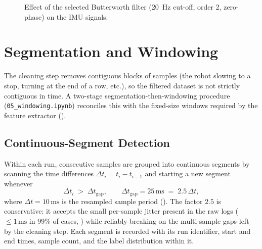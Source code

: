 \begin{figure}[H]
    \centering
    \caption{Effect of the selected Butterworth filter
    (\SI{20}{\hertz} cut-off, order 2, zero-phase) on the IMU signals.}
    \label{fig:filter_effect}
\end{figure}

\section{Segmentation and Windowing}
\label{sec:windowing}

The cleaning step removes contiguous blocks of samples (the robot slowing to a stop, turning at the end of a row, etc.), so the filtered dataset is not strictly contiguous in time. A two-stage segmentation-then-windowing procedure (\texttt{05\_windowing.ipynb}) reconciles this with the fixed-size windows required by the feature extractor ().

\subsection{Continuous-Segment Detection}

Within each run, consecutive samples are grouped into continuous segments by scanning the time differences $\Delta t_i = t_i - t_{i-1}$ and starting a new segment whenever
\begin{equation}
    \Delta t_i \;>\; \Delta t_{\mathrm{gap}}, \qquad
    \Delta t_{\mathrm{gap}} = 25\,\text{ms} \;=\; 2.5\,\Delta t,
    \label{eq:gap_threshold}
\end{equation}
where $\Delta t = 10\,\text{ms}$ is the resampled sample period (). The factor $2.5$ is conservative: it accepts the small per-sample jitter present in the raw logs ($\le 1\,\text{ms}$ in 99\% of cases, ) while reliably breaking on the multi-sample gaps left by the cleaning step. Each segment is recorded with its run identifier, start and end times, sample count, and the label distribution within it.

